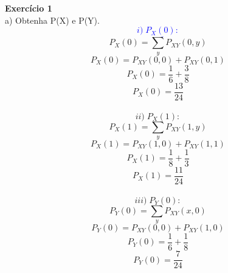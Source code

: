 \documentclass[a4paper]{article}
\begin{document}
\textbf{Exercício 1}
\\
a) Obtenha P(X) e P(Y).
\\
\textcolor{blue}{
\begin{equation}
	i) \; \underline{P_X(0):}
\end{equation}
}
\begin{equation}
	P_X(0) = \sum_{y} P_{XY}(0,y)
\end{equation}
\begin{equation}
	P_X(0) = P_{XY}(0,0) + P_{XY}(0,1)
\end{equation}
\begin{equation}
	P_X(0) = \frac{1}{6} + \frac{3}{8}
\end{equation}
\begin{equation}
	P_X(0) = \frac{13}{24}
\end{equation}
\\
\begin{equation}
	ii) \; P_X(1):
\end{equation}
\begin{equation}
	P_X(1) = \sum_{y} P_{XY}(1,y)
\end{equation}
\begin{equation}
	P_X(1) = P_{XY}(1,0) + P_{XY}(1,1)
\end{equation}
\begin{equation}
	P_X(1) = \frac{1}{8} + \frac{1}{3}
\end{equation}
\begin{equation}
	P_X(1) = \frac{11}{24}
\end{equation}
\\
\begin{equation}
	iii) \; P_Y(0):
\end{equation}
\begin{equation}
	P_Y(0) = \sum_{y} P_{XY}(x,0)
\end{equation}
\begin{equation}
	P_Y(0) = P_{XY}(0,0) + P_{XY}(1,0)
\end{equation}
\begin{equation}
	P_Y(0) = \frac{1}{6} + \frac{1}{8}
\end{equation}
\begin{equation}
	P_Y(0) = \frac{7}{24}
\end{equation}
\\
\end{document}

